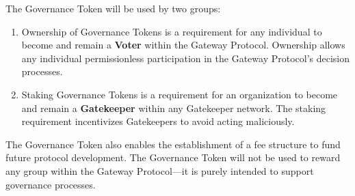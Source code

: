 The Governance Token will be used by two groups:
\begin{enumerate}
\item Ownership of Governance Tokens is a requirement for any individual to become and remain a \textbf{Voter} within the Gateway Protocol. Ownership allows any individual permissionless participation in the Gateway Protocol’s decision processes.
\item Staking Governance Tokens is a requirement for an organization to become and remain a \textbf{Gatekeeper} within any Gatekeeper network. The staking requirement incentivizes Gatekeepers to avoid acting maliciously.
\end{enumerate}

The Governance Token also enables the establishment of a fee structure to fund future protocol development. The Governance Token will not be used to reward any group within the Gateway Protocol—it is purely intended to support governance processes.

